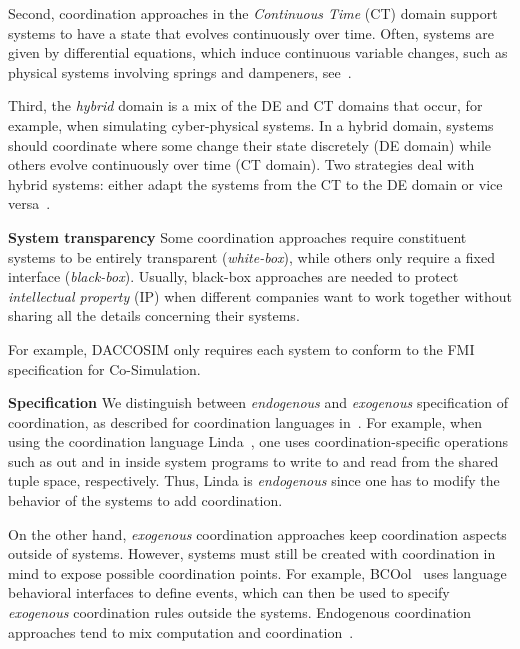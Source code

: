 \documentclass[runningheads]{llncs}
\newcommand{\feature}[1]{\textbf{#1}}
\begin{document}
Second, coordination approaches in the \textit{Continuous Time} (CT) domain support systems to have a state that evolves continuously over time.
Often, systems are given by differential equations, which induce continuous variable changes, such as physical systems involving springs and dampeners, see~\cite{gomesCoSimulationSurvey2019}.

Third, the \textit{hybrid} domain is a mix of the DE and CT domains that occur, for example, when simulating cyber-physical systems.
In a hybrid domain, systems should coordinate where some change their state discretely (DE domain) while others evolve continuously over time (CT domain).
Two strategies deal with hybrid systems: either adapt the systems from the CT to the DE domain or vice versa~\cite{gomesCoSimulationSurvey2019}.

\feature{System transparency} Some coordination approaches require constituent systems to be entirely transparent (\textit{white-box}), while others only require a fixed interface (\textit{black-box}).
Usually, black-box approaches are needed to protect \textit{intellectual property} (IP) when different companies want to work together without sharing all the details concerning their systems.

For example, DACCOSIM only requires each system to conform to the FMI specification for Co-Simulation.

\feature{Specification} We distinguish between \textit{endogenous} and \textit{exogenous} specification of coordination, as described for coordination languages in~\cite{arbabWhatYouMean1998}.
For example, when using the coordination language Linda~\cite{carrieroLindaContext1989}, one uses coordination-specific operations such as \textsf{out} and \textsf{in} inside system programs to write to and read from the shared tuple space, respectively.
Thus, Linda is \textit{endogenous} since one has to modify the behavior of the systems to add coordination.

On the other hand, \textit{exogenous} coordination approaches keep coordination aspects outside of systems.
However, systems must still be created with coordination in mind to expose possible coordination points.
For example, BCOol~\cite{varalarsenBehavioralCoordinationOperator2015} uses language behavioral interfaces to define events, which can then be used to specify \textit{exogenous} coordination rules outside the systems.
Endogenous coordination approaches tend to mix computation and coordination~\cite{arbabWhatYouMean1998}.
\end{document}
